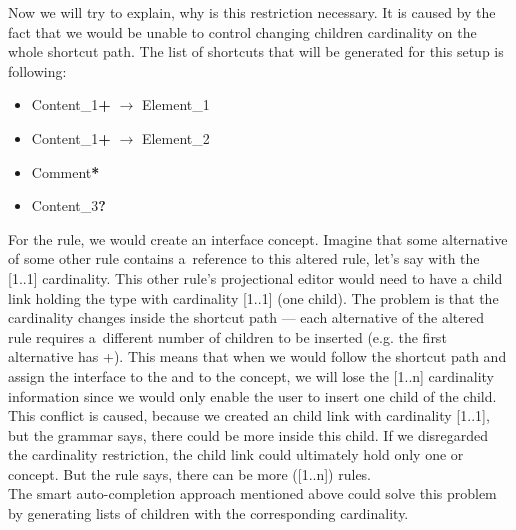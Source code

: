 Now we will try to explain, why is this restriction necessary.
It is caused by the fact that we would be unable to control changing children cardinality on the whole shortcut path.
The list of shortcuts that will be generated for this setup is following:

\begin{itemize}
	\itemsep0em
	\item Content{\_}1\textbf{+} $\rightarrow$ Element{\_}1
	\item Content{\_}1\textbf{+} $\rightarrow$ Element{\_}2
	\item Comment\textbf{*}
	\item Content{\_}3\textbf{?}
\end{itemize}

For the  rule, we would create an  interface concept.
Imagine that some alternative of some other rule contains a~reference to this altered  rule, let's say with the [1..1] cardinality.
This other rule's projectional editor would need to have a child link holding the  type with cardinality [1..1] (one child).
The problem is that the cardinality changes inside the shortcut path --- each alternative of the altered  rule requires a~different number of children to be inserted (e.g. the first alternative has +).
This means that when we would follow the shortcut path and assign the  interface to the  and to the  concept, we will lose the [1..n] cardinality information since we would only enable the user to insert one child of the  child.
This conflict is caused, because we created an  child link with cardinality [1..1], but the grammar says, there could be more  inside this child.
If we disregarded the cardinality restriction, the child link could ultimately hold only one  or  concept.
But the  rule says, there can be more ([1..n])  rules.
\\

The smart auto-completion approach mentioned above could solve this problem by generating lists of children with the corresponding cardinality.
